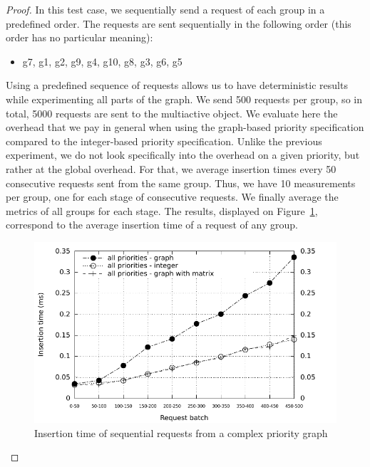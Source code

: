\documentclass[11pt]{report}
\begin{document}
\begin{proof}
In this test case, we sequentially send a request of each group in a predefined order. The requests are sent sequentially in the following order (this order has no particular meaning):
\begin{itemize}
\item g7, g1, g2, g9, g4, g10, g8, g3, g6, g5
\end{itemize}
Using a predefined sequence of requests allows us to have deterministic results while experimenting all parts of the graph. We send 500 requests per group, so in total, 5000 requests are sent to the multiactive object. 
We evaluate here the overhead that we pay in general when using the graph-based priority specification compared to the integer-based priority specification. Unlike the previous experiment, we do not look specifically into the overhead on a given priority, but rather at the global overhead. For that, we average insertion times every 50 consecutive requests sent from the same group. Thus, we have 10 measurements per group, one for each stage of consecutive requests. We finally average the metrics of all groups for each stage. The results, displayed on Figure~\ref{fig:sequential}, correspond to the average insertion time of a request of any group.

\begin{figure}[!ht]
      \begin{minipage}[c]{\textwidth}
      \centering
      \includegraphics[scale=1]{pictures/sequential.pdf}
      \end{minipage}
      \caption{Insertion time of sequential requests from a complex priority graph}
      \label{fig:sequential} 
\end{figure}


\end{proof}
\end{document}
